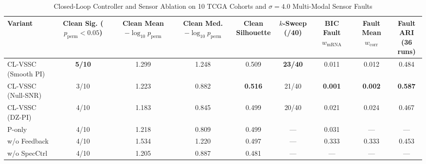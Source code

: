 \begin{table}[t]
\centering
\caption{Closed-Loop Controller and Sensor Ablation on 10 TCGA Cohorts and $\sigma=4.0$ Multi-Modal Sensor Faults}
\label{tab:p2_ablation}
\scriptsize
\renewcommand{\arraystretch}{1.14}
\setlength{\tabcolsep}{3.0pt}
\begin{tabular}{lcccccccc}
\toprule
Variant & \shortstack{Clean Sig.\\($p_{\mathrm{perm}}{<}0.05$)} & \shortstack{Clean Mean\\$-\log_{10}p_{\mathrm{perm}}$} & \shortstack{Clean Med.\\$-\log_{10}p_{\mathrm{perm}}$} & \shortstack{Clean\\Silhouette} & \shortstack{$k$-Sweep\\(/40)} & \shortstack{BIC Fault\\$w_{\mathrm{mRNA}}$} & \shortstack{Fault Mean\\$w_{\mathrm{corr}}$} & \shortstack{Fault ARI\\(36 runs)} \\
\midrule
CL-VSSC (Smooth PI) & \textbf{5/10} & 1.299 & 1.248 & 0.509 & \textbf{23/40} & 0.011 & 0.012 & 0.484 \\
CL-VSSC (Null-SNR) & 3/10 & 1.223 & 0.882 & \textbf{0.516} & 21/40 & \textbf{0.001} & \textbf{0.002} & \textbf{0.587} \\
CL-VSSC (DZ-PI) & 4/10 & 1.183 & 0.845 & 0.499 & 20/40 & 0.021 & 0.024 & 0.467 \\
P-only & 4/10 & 1.218 & 0.809 & 0.499 & --- & 0.031 & --- & --- \\
w/o Feedback & 4/10 & 1.534 & 1.220 & 0.497 & --- & 0.333 & 0.333 & 0.453 \\
w/o SpecCtrl & 4/10 & 1.205 & 0.887 & 0.481 & --- & --- & --- & --- \\
\bottomrule
\end{tabular}
\end{table}
